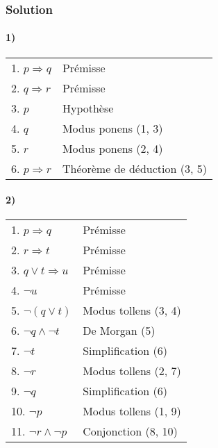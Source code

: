     \subsubsection*{Solution}
    
    \paragraph{1)}
    \begin{center}
    \begin{tabular}{|l|l|}
    \hline
    1. $p \Rightarrow q$ & Prémisse \\
    2. $q \Rightarrow r$ & Prémisse \\
    \hspace{0.5cm} 3. $p$ & Hypothèse \\
    \hspace{0.5cm} 4. $q$ & Modus ponens (1, 3) \\
    \hspace{0.5cm} 5. $r$ & Modus ponens (2, 4) \\ 
    6. $p \Rightarrow r$ & Théorème de déduction (3, 5) \\
    \hline
    \end{tabular}
    \end{center}
    
    \paragraph{2)}
    \begin{center}
    \begin{tabular}{|l|l|}
    \hline
    1. $p \Rightarrow q$ & Prémisse \\
    2. $r \Rightarrow t$ & Prémisse \\
    3. $q \lor t \Rightarrow u $ & Prémisse \\
    4. $\lnot u$ & Prémisse \\
    5. $\lnot (q \lor t)$ & Modus tollens (3, 4) \\ 
    6. $\lnot q \land \lnot t$ & De Morgan (5) \\
    7. $\lnot t$ & Simplification (6) \\
    8. $\lnot r$ & Modus tollens (2, 7) \\
    9. $\lnot q$ & Simplification (6) \\
    10. $\lnot p$ & Modus tollens (1, 9) \\
    11. $\lnot r \land \lnot p$ & Conjonction (8, 10) \\
    \hline
    \end{tabular}
    \end{center}
    

